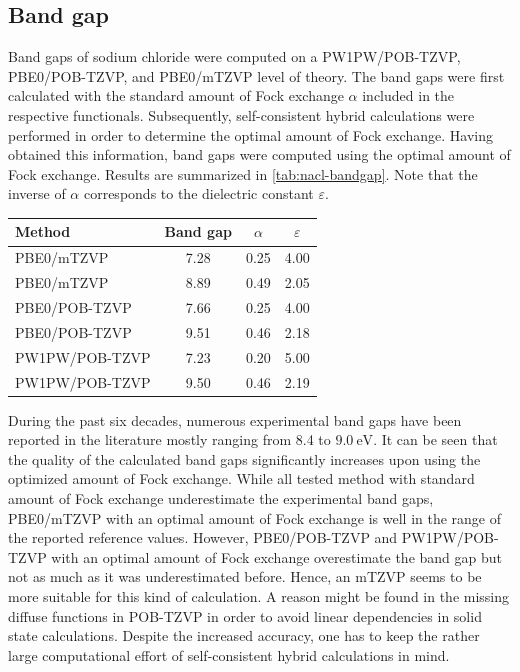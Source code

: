 \documentclass[a4paper,12pt]{scrartcl}
\begin{document}
\subsection{Band gap}
%
Band gaps of sodium chloride were computed on a PW1PW\autocite[]{pw1pw}/POB-TZVP\autocite[]{pob-xzvp}, PBE0/POB-TZVP, and PBE0/mTZVP\autocite[]{mtzvp} level of theory. The band gaps were first calculated with the standard amount of Fock exchange $ \alpha $ included in the respective functionals. Subsequently, self-consistent hybrid calculations were performed in order to determine the optimal amount of Fock exchange. Having obtained this information, band gaps were computed using the optimal amount of Fock exchange. Results are summarized in \autoref{tab:nacl-bandgap}. Note that the inverse of $ \alpha $ corresponds to the dielectric constant $ \varepsilon $.
%
\begin{table}[H]
	\centering
	\label{tab:nacl-bandgap}
	\begin{tabular}{lccc}
		\toprule
		Method         & Band gap & $ \alpha $ & $ \varepsilon $ \\
		\midrule
		PBE0/mTZVP     & 7.28     & 0.25       & 4.00            \\
		PBE0/mTZVP     & 8.89     & 0.49       & 2.05            \\
		PBE0/POB-TZVP  & 7.66     & 0.25       & 4.00            \\
		PBE0/POB-TZVP  & 9.51     & 0.46       & 2.18            \\
		PW1PW/POB-TZVP & 7.23     & 0.20       & 5.00            \\
		PW1PW/POB-TZVP & 9.50     & 0.46       & 2.19            \\
		\bottomrule
	\end{tabular}
\end{table}
%
During the past six decades, numerous experimental band gaps have been reported in the literature\autocite[]{nacl-bandgaps} mostly ranging from 8.4 to $ \SI{9.0}{\electronvolt}$. It can be seen that the quality of the calculated band gaps significantly increases upon using the optimized amount of Fock exchange. While all tested method with standard amount of Fock exchange underestimate the experimental band gaps, PBE0/mTZVP with an optimal amount of Fock exchange is well in the range of the reported reference values. However, PBE0/POB-TZVP and PW1PW/POB-TZVP with an optimal amount of Fock exchange overestimate the band gap but not as much as it was underestimated before. Hence, an mTZVP seems to be more suitable for this kind of calculation. A reason might be found in the missing diffuse functions in POB-TZVP in order to avoid linear dependencies in solid state calculations. Despite the increased accuracy, one has to keep the rather large computational effort of self-consistent hybrid calculations in mind.
%
\end{document}
